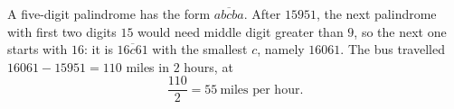 A five-digit palindrome has the form $\overline{abcba}$. After $15951$, the next palindrome with first two digits $15$ would need middle digit greater than $9$, so the next one starts with $16$: it is $\overline{16c61}$ with the smallest $c$, namely $16061$. The bus travelled $16061-15951=110$ miles in $2$ hours, at
\[
\dfrac{110}{2}=\boxed{55}\ \text{miles per hour}.
\]
